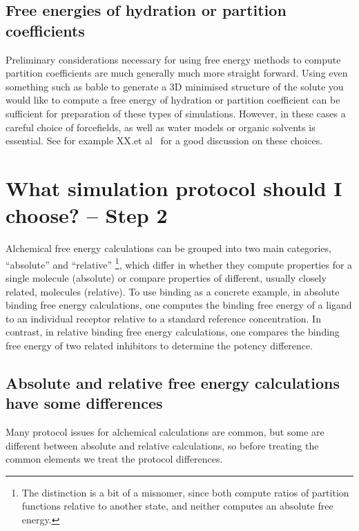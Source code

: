 \documentclass[9pt,bestpractices]{livecoms}
\begin{document}
\subsection*{Free energies of hydration or partition coefficients}
Preliminary considerations necessary for using free energy methods to compute partition coefficients are much generally much more straight forward. Using even something such as bable to generate a 3D minimised structure of the solute you would like to compute a free energy of hydration or partition coefficient can be sufficient for preparation of these types of simulations. However, in these cases a careful choice of forcefields, as well as water models or organic solvents is essential. See for example XX.et al~\cite{xxx} for a good discussion on these choices. 
%
%
%
%
\section{What simulation protocol should I choose? -- Step 2}
\label{sec:step2}
Alchemical free energy calculations can be grouped into two main categories, ``absolute'' and ``relative'' \footnote{The distinction is a bit of a misnomer, since both compute ratios of partition functions relative to another state, and neither computes an absolute free energy.}, which differ in whether they compute properties for a single molecule (absolute) or compare properties of different, usually closely related, molecules (relative).
To use binding as a concrete example, in absolute binding free energy calculations, one computes the binding free energy of a ligand to an individual receptor relative to a standard reference concentration.
In contrast, in relative binding free energy calculations, one compares the binding free energy of two related inhibitors to determine the potency difference.
\subsection*{Absolute and relative free energy calculations have some differences}
Many protocol issues for alchemical calculations are common, but some are different between absolute and relative calculations, so before treating the common elements we treat the protocol differences.
\end{document}
